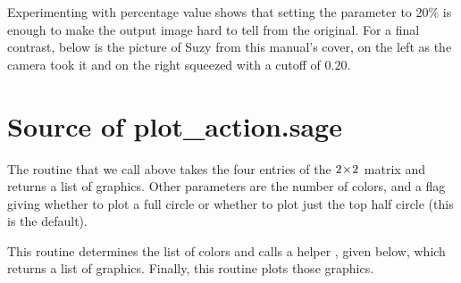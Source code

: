 Experimenting with percentage value shows that setting
the parameter to $20\%$ is enough to make the output image hard to tell
from the original.
For a final contrast, below is the picture of Suzy from this manual's cover, 
on the left 
as the camera took it and on the right squeezed with a cutoff of $0.20$.
\begin{center}
  \quad
\end{center}



\section{Source of plot\_action.sage}

The 
routine that we call above takes the four entries of the $2 \! \times \! 2$
matrix and returns a list of graphics.
Other parameters are the number of colors, and a flag giving whether
to plot a full circle or whether to plot just the top half circle (this
is the default).

This routine determines the list of colors and 
calls a helper , 
given below, which returns a list of graphics.
Finally, this routine plots those graphics.


